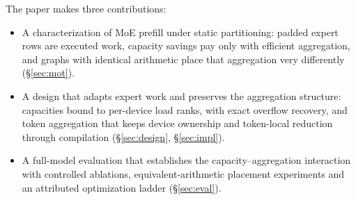 The paper makes three contributions:
\begin{itemize}
\item A characterization of MoE prefill under static partitioning: padded expert rows are executed work, capacity savings
  pay only with efficient aggregation, and graphs with identical arithmetic place that aggregation very differently
  (\S\ref{sec:mot}).
\item A design that adapts expert work and preserves the aggregation structure: capacities bound to per-device load ranks,
  with exact overflow recovery, and token aggregation that keeps device ownership and token-local reduction through
  compilation (\S\ref{sec:design}, \S\ref{sec:impl}).
\item A full-model evaluation that establishes the capacity--aggregation interaction with controlled ablations,
  equivalent-arithmetic placement experiments and an attributed optimization ladder (\S\ref{sec:eval}).
\end{itemize}
